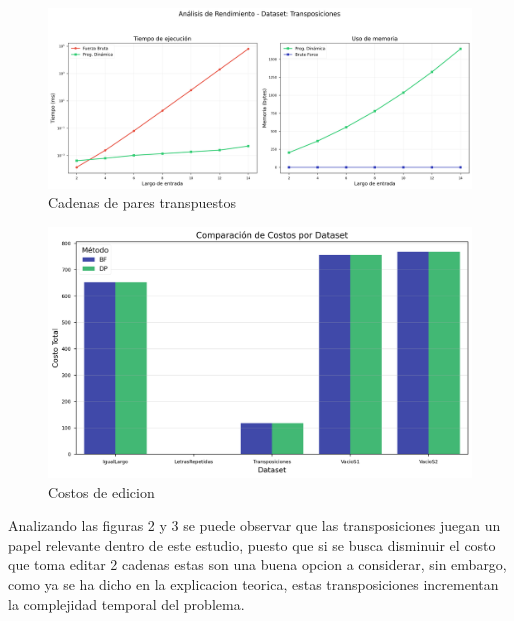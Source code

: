 \begin{figure}[H]
    \centering
        \includegraphics[width=\textwidth]{images/Transposiciones_analisis.png}
    \caption{Cadenas de pares transpuestos}
    \label{fig:scatterplot_2}
\end{figure}
\begin{figure}[H]
    \centering
    \begin{minipage}[t]{0.5\textwidth}
        \includegraphics[width=\textwidth]{images/costos_por_dataset.png}
    \end{minipage}%
    \caption{Costos de edicion}
    \label{fig:barplot_1}
\end{figure}
Analizando las figuras 2 y 3 se puede observar que las transposiciones juegan un papel relevante dentro de este estudio,
puesto que si se busca disminuir el costo que toma editar 2 cadenas estas son una buena opcion a considerar, sin embargo, como ya se ha dicho
en la explicacion teorica, estas transposiciones incrementan la complejidad temporal del problema.  

